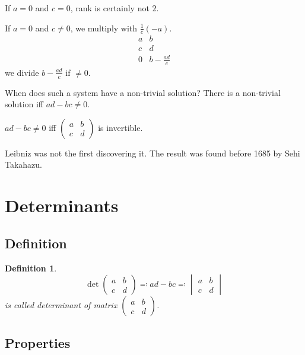 \documentclass[a4paper]{article}
\newcounter{lecref}[section]
\numberwithin{lecref}{section}
\newtheorem{definition}[lecref]{Definition}
\begin{document}
If $a=0$ and $c=0$, rank is certainly not $2$.

If $a=0$ and $c \neq 0$, we multiply with $\frac1c (-a)$.
\[
  \begin{array}{cc}
    a & b \\
    c & d \\
  \hline
    0 & b-\frac{ad}{c}
  \end{array}
\]
we divide $b - \frac{ad}{c}$ if $\neq 0$.

When does such a system have a non-trivial solution?
There is a non-trivial solution iff $ad - bc \neq 0$.

$ad - bc \neq 0$ iff $\begin{pmatrix} a & b \\ c & d \end{pmatrix}$ is invertible.

Leibniz was not the first discovering it. The result was found before 1685 by Sehi Takahazu.

\section{Determinants}

\subsection{Definition}

\begin{definition} %
  \[ \det{\begin{pmatrix} a & b \\ c & d \end{pmatrix}} \eqqcolon ad - bc \eqqcolon \begin{vmatrix} a & b \\ c & d \end{vmatrix} \]
  is called \emph{determinant of matrix $\begin{pmatrix} a & b \\ c & d \end{pmatrix}$}.
\end{definition}

\subsection{Properties}
\end{document}
